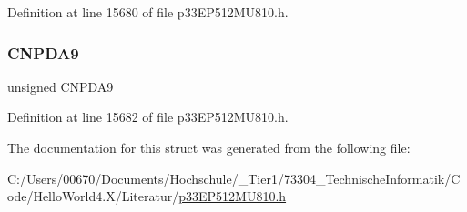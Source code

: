 Definition at line 15680 of file p33\+E\+P512\+M\+U810.\+h.

\mbox{\label{structtag_c_n_p_d_a_b_i_t_s_a427d50c1df140741dbc05e0d0e08da34}} 
\subsubsection{\texorpdfstring{C\+N\+P\+D\+A9}{CNPDA9}}
{\footnotesize\ttfamily unsigned C\+N\+P\+D\+A9}



Definition at line 15682 of file p33\+E\+P512\+M\+U810.\+h.



The documentation for this struct was generated from the following file\+:\begin{DoxyCompactItemize}
\item 
C\+:/\+Users/00670/\+Documents/\+Hochschule/\+\_\+\+Tier1/73304\+\_\+\+Technische\+Informatik/\+Code/\+Hello\+World4.\+X/\+Literatur/\hyperlink{p33_e_p512_m_u810_8h}{p33\+E\+P512\+M\+U810.\+h}\end{DoxyCompactItemize}
